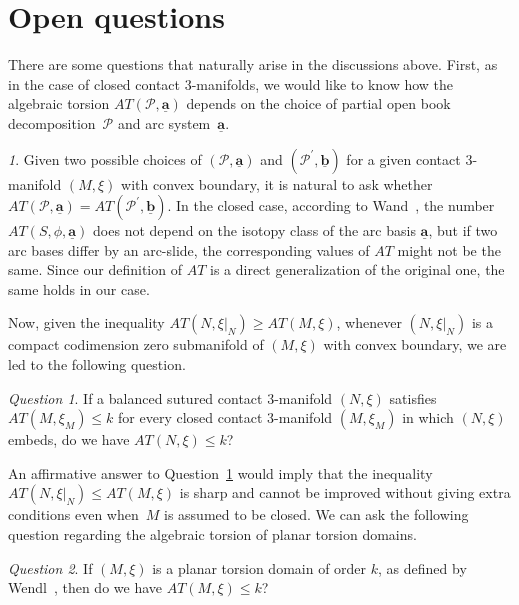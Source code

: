\documentclass[11pt,oneside,english]{amsart}
\numberwithin{equation}{section}
\numberwithin{figure}{section}
\theoremstyle{definition}
\theoremstyle{plain}
\theoremstyle{plain}
\theoremstyle{remark}
\newtheorem*{rem*}{\protect\remarkname}
\newtheorem{qn}{Question}
\theoremstyle{plain}
\providecommand{\remarkname}{Remark}
\begin{document}
\section{Open questions}

There are some questions that naturally arise in the discussions above.
First, as in the case of closed contact $3$-manifolds, we would like to
know how the algebraic torsion ${\mathit{AT}}(\mathcal{P},\underline{\mathbf{a}})$
depends on the choice of partial open book decomposition~$\mathcal{P}$ and
arc system~$\underline{\mathbf{a}}$.

\begin{rem*}
Given two possible choices of $(\mathcal{P},\underline{\mathbf{a}})$
and $(\mathcal{P}^{\prime},\underline{\mathbf{b}})$ for a given
contact $3$-manifold $(M,\xi)$ with convex boundary, it is natural to ask whether
${\mathit{AT}}(\mathcal{P},\underline{\mathbf{a}})={\mathit{AT}}(\mathcal{P}^{\prime},\underline{\mathbf{b}})$.
In the closed case, according to Wand~\cite{key-13}, the number ${\mathit{AT}}(S,\phi,\underline{\mathbf{a}})$
does not depend on the isotopy class of the arc basis $\underline{\mathbf{a}}$,
but if two arc bases differ by an arc-slide, the corresponding values
of ${\mathit{AT}}$ might not be the same. Since our definition of ${\mathit{AT}}$ is a direct
generalization of the original one, the same holds in our case.
\end{rem*}

Now, given the inequality ${\mathit{AT}}(N,\xi|_{N}) \ge {\mathit{AT}}(M,\xi)$,
whenever $(N,\xi|_{N})$ is a compact codimension zero submanifold
of $(M,\xi)$ with convex boundary, we are led to the following question.

\begin{qn} \label{qn:1}
If a balanced sutured contact $3$-manifold $(N,\xi)$ satisfies
${\mathit{AT}}(M,\xi_{M}) \le k$ for every closed contact $3$-manifold
$(M,\xi_{M})$ in which $(N,\xi)$ embeds, do we have ${\mathit{AT}}(N,\xi)\le k$?
\end{qn}

An affirmative answer to Question~\ref{qn:1} would imply that the inequality
${\mathit{AT}}(N,\xi|_{N}) \le {\mathit{AT}}(M,\xi)$ is sharp
and cannot be improved without giving extra conditions even when~$M$
is assumed to be closed. We can ask the following question
regarding the algebraic torsion of planar torsion domains.

\begin{qn} \label{qn:2}
If $(M,\xi)$ is a planar torsion domain of order $k$, as
defined by Wendl~\cite{Wendl},
then do we have ${\mathit{AT}}(M,\xi) \le k$?
\end{qn}
\end{document}
